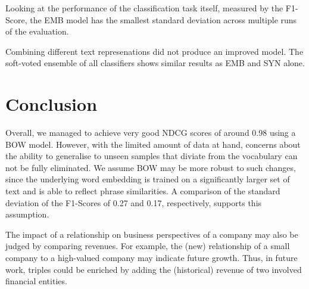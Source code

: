 Looking at the performance of the classification task itself, measured by the F1-Score, the EMB model has the smallest standard deviation across multiple runs of the evaluation.

Combining different text represenations did not produce an improved model.
The soft-voted ensemble of all classifiers shows similar results as EMB and SYN alone.

\section{Conclusion}
Overall, we managed to achieve very good NDCG scores of around 0.98 using a BOW model.
However, with the limited amount of data at hand, concerns about the ability to generalise to unseen samples that diviate from the vocabulary can not be fully eliminated.
We assume BOW may be more robust to such changes, since the underlying word embedding is trained on a significantly larger set of text and is able to reflect phrase similarities.
A comparison of the standard deviation of the F1-Scores of 0.27 and 0.17, respectively, supports this assumption.

The impact of a relationship on business perspectives of a company may also be judged by comparing revenues.
For example, the (new) relationship of a small company to a high-valued company may indicate future growth.
Thus, in future work, triples could be enriched by adding the (historical) revenue of two involved financial entities. 



%


